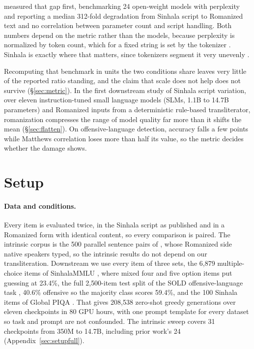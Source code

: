 \documentclass{article}
\begin{document}
\citet{rajapakse-weerasinghe-2026-script} measured that gap first, benchmarking 24
open-weight models with perplexity and reporting a median 312-fold degradation from
Sinhala script to Romanized text and no correlation between parameter count and script
handling. Both numbers depend on the metric rather than the models, because
perplexity is normalized by token count, which for a fixed string is set by the tokenizer \citep{gao-etal-2020-pile, magnusson-etal-2024-paloma}.
Sinhala is exactly where that matters, since tokenizers segment it very unevenly
\citep{petrov-etal-2023-tokenizers, ahia-etal-2023-languages}.

Recomputing that benchmark in units the two conditions share leaves very little of the
reported ratio standing, and the claim that scale does not help does not survive
(\S\ref{sec:metric}). In the first downstream study of Sinhala script variation, over eleven
instruction-tuned small language models
(SLMs, 1.1B to 14.7B parameters) and Romanized inputs from a deterministic rule-based
transliterator, romanization compresses the range of model quality far more than it shifts
the mean (\S\ref{sec:flatten}). On offensive-language detection, accuracy falls a few
points while Matthews correlation loses more than half its value, so the metric decides
whether the damage shows.

\section{Setup}
\label{sec:setup}

\paragraph{Data and conditions.} Every item is evaluated twice, in the Sinhala script as
published and in a Romanized form with identical content, so every comparison is paired. The intrinsic corpus is the 500 parallel
sentence pairs of \citet{rajapakse-weerasinghe-2026-script}, whose Romanized side native
speakers typed, so the intrinsic results do not depend on our transliteration. Downstream we use every item of three sets, the
6{,}879 multiple-choice items of SinhalaMMLU \citep{pramodya-etal-2025-sinhalammlu},
where mixed four and five option items put guessing at 23.4\%, the
full 2{,}500-item test split of the SOLD offensive-language task
\citep{ranasinghe-etal-2025-sold}, 40.6\% offensive so the majority class scores
59.4\%, and the 100 Sinhala items of Global PIQA \citep{chang-etal-2025-globalpiqa,
desilva-ranathunga-2026-sinhalapiqa}. That gives 208{,}538 zero-shot greedy generations over eleven checkpoints in 80 GPU hours, with one prompt template for every dataset so task and prompt are not confounded. The intrinsic sweep covers 31 checkpoints from 350M to 14.7B, including prior work's 24 (Appendix~\ref{sec:setupfull}).
\end{document}
